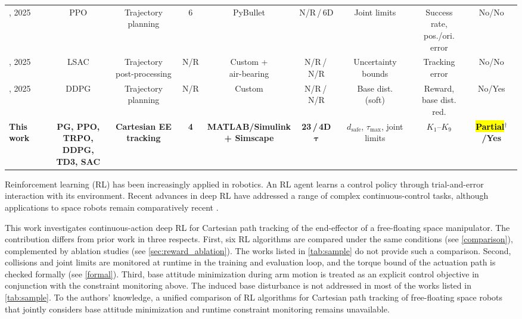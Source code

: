 \documentclass{ieeeaccess}
\newcommand{\hlone}[1]{{\sethlcolor{rone}\hl{#1}}}
\begin{document}
\begin{table}[!t]
\begin{tabular}{lcccccccc}
		\cite{hu2025deep}, 2025 & PPO & Trajectory planning & 6 & PyBullet & N/R\,/\,6D & Joint limits &
		  \makecell{Success rate,\\pos./ori. error} & No/No \\
		\cite{zhang2025learning}, 2025 & LSAC & \makecell{Trajectory\\post-processing} & N/R &
		  \makecell{Custom +\\air-bearing} & N/R\,/\,N/R & \makecell{Uncertainty\\bounds} & Tracking error &
		  No/No \\
		\cite{wei2025trajectory}, 2025 & DDPG & Trajectory planning & N/R & Custom & N/R\,/\,N/R &
		  \makecell{Base dist.\\(soft)} & \makecell{Reward,\\base dist. red.} & No/Yes \\
		\midrule
		\textbf{This work} &
		  \makecell{\textbf{PG, PPO,}\\\textbf{TRPO, DDPG,}\\\textbf{TD3, SAC}} &
		  \makecell{\textbf{Cartesian EE}\\\textbf{tracking}} & \textbf{4} &
		  \makecell{\textbf{MATLAB/Simulink}\\\textbf{+ Simscape}} & \textbf{23\,/\,4D} $\boldsymbol{\tau}$ &
		  \makecell{$d_{\mathrm{safe}}$, $\tau_{\max}$,\\joint limits} & $K_1$--$K_9$ &
		  \textbf{\hlone{Partial}}$^{\dagger}$\textbf{/Yes} \\
		\bottomrule
	\end{tabular}
\end{table}

Reinforcement learning (RL) has been increasingly applied in robotics. An RL agent learns a control policy
through trial-and-error interaction with its environment. Recent advances in deep RL
have addressed a range of complex continuous-control tasks, although applications to space robots remain
comparatively recent \cite{wu2020reinforcement,al2024path,hu2025deep,zhang2025learning,huang2023obstacle}.

This work investigates continuous-action deep RL for Cartesian path tracking of the end-effector of
a free-floating space
manipulator. The contribution differs from prior work in three respects. First, six RL algorithms are compared
under the same conditions (see \cref{comparison}), complemented by ablation studies (see \cref{sec:reward_ablation}).
The works listed in \cref{tab:sample} do not provide such a comparison. Second, collisions
and joint limits are monitored at runtime in the training and evaluation loop, and the torque bound of the
actuation path is checked formally (see \cref{formal}). Third, base attitude minimization during
arm motion is treated as an explicit control objective in conjunction with the constraint monitoring
above. The induced base disturbance is not addressed in most of the works listed in \cref{tab:sample}. To
the authors' knowledge, a unified comparison of RL algorithms for Cartesian path tracking of
free-floating space robots that jointly considers base attitude minimization and runtime
constraint monitoring remains unavailable.
\end{document}
